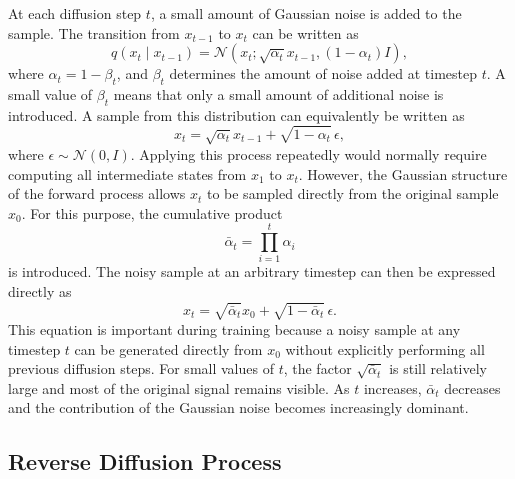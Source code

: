 \documentclass[english,ba]{tudo-sse-thesis}
\begin{document}
At each diffusion step \(t\), a small amount of Gaussian noise is added
to the sample. The transition from \(x_{t-1}\) to \(x_t\) can be written
as
\begin{equation}
    q(x_t \mid x_{t-1})
    =
    \mathcal{N}
    \left(
        x_t;
        \sqrt{\alpha_t}x_{t-1},
        (1-\alpha_t)I
    \right),
\end{equation}
where \(\alpha_t = 1-\beta_t\), and \(\beta_t\) determines the amount of
noise added at timestep \(t\). A small value of \(\beta_t\) means that only a small amount of additional noise is introduced. A sample from this distribution can equivalently be written as
\begin{equation}
    x_t
    =
    \sqrt{\alpha_t}x_{t-1}
    +
    \sqrt{1-\alpha_t}\,\epsilon,
\end{equation}
where \(\epsilon \sim \mathcal{N}(0,I)\). Applying this process repeatedly would normally require computing all intermediate states from \(x_1\) to \(x_t\). However, the Gaussian structure of the forward process allows \(x_t\) to be sampled directly from the original sample \(x_0\). For this purpose, the cumulative product
\begin{equation}
    \bar{\alpha}_t
    =
    \prod_{i=1}^{t}\alpha_i
\end{equation}
is introduced. The noisy sample at an arbitrary timestep can then be
expressed directly as
\begin{equation}
    x_t
    =
    \sqrt{\bar{\alpha}_t}x_0
    +
    \sqrt{1-\bar{\alpha}_t}\,\epsilon.
    \label{eq:forward_direct}
\end{equation}
This equation is important during training because a noisy sample at any
timestep \(t\) can be generated directly from \(x_0\) without explicitly
performing all previous diffusion steps.
For small values of \(t\), the factor \(\sqrt{\bar{\alpha}_t}\) is still relatively large and most of the original signal remains visible. As \(t\) increases, \(\bar{\alpha}_t\) decreases and the contribution of the Gaussian noise becomes increasingly dominant.

\subsection{Reverse Diffusion Process}
\end{document}
